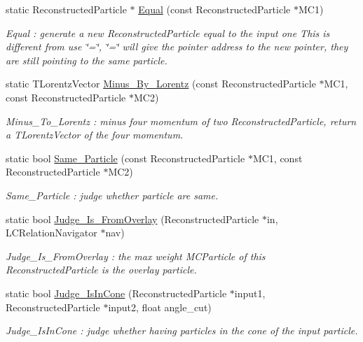 \begin{DoxyCompactItemize}
static ReconstructedParticle $\ast$ \hyperlink{classToolSet_1_1CRC_a19c6ca3d07dbf23e55127756f63b9020}{Equal} (const ReconstructedParticle $\ast$MC1)
\begin{DoxyCompactList}\small\item\em Equal : generate a new ReconstructedParticle equal to the input one This is different from use \char`\"{}=\char`\"{}, \char`\"{}=\char`\"{} will give the pointer address to the new pointer, they are still pointing to the same particle. \item\end{DoxyCompactList}\item 
static TLorentzVector \hyperlink{classToolSet_1_1CRC_a152788d7b317ba47c0f003fd3c574caa}{Minus\_\-By\_\-Lorentz} (const ReconstructedParticle $\ast$MC1, const ReconstructedParticle $\ast$MC2)
\begin{DoxyCompactList}\small\item\em Minus\_\-To\_\-Lorentz : minus four momentum of two ReconstructedParticle, return a TLorentzVector of the four momentum. \item\end{DoxyCompactList}\item 
static bool \hyperlink{classToolSet_1_1CRC_a358ee6636901b5a552783d4fd9dfeec9}{Same\_\-Particle} (const ReconstructedParticle $\ast$MC1, const ReconstructedParticle $\ast$MC2)
\begin{DoxyCompactList}\small\item\em Same\_\-Particle : judge whether particle are same. \item\end{DoxyCompactList}\item 
static bool \hyperlink{classToolSet_1_1CRC_a3f2e8fcac0ebafa986567bd8c14f5656}{Judge\_\-Is\_\-FromOverlay} (ReconstructedParticle $\ast$in, LCRelationNavigator $\ast$nav)
\begin{DoxyCompactList}\small\item\em Judge\_\-Is\_\-FromOverlay : the max weight MCParticle of this ReconstructedParticle is the overlay particle. \item\end{DoxyCompactList}\item 
static bool \hyperlink{classToolSet_1_1CRC_a28ee046a19ec975f344122b2f8c2f3bf}{Judge\_\-IsInCone} (ReconstructedParticle $\ast$input1, ReconstructedParticle $\ast$input2, float angle\_\-cut)
\begin{DoxyCompactList}\small\item\em Judge\_\-IsInCone : judge whether having particles in the cone of the input particle. \item\end{DoxyCompactList}\item 

\end{DoxyCompactItemize}
